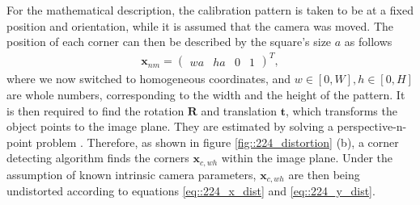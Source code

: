 For the mathematical description, the calibration pattern is taken to be at a fixed position and orientation, while it is assumed that the camera was moved. The position of each corner can then be described by the square's size $a$ as follows
\begin{align}
	\bm{x}_{nm} = \begin{pmatrix}
	wa & ha & 0 & 1
	\end{pmatrix}^T,
	\label{eq::224_square_size}
\end{align}
where we now switched to homogeneous coordinates, and $w\in[0,W],h\in[0,H]$ are whole numbers, corresponding to the width and the height of the pattern. It is then required to find the rotation $\bm{R}$ and translation $\bm{t}$, which transforms the object points to the image plane. They are estimated by solving a perspective-n-point problem \cite{fischler1981random}. Therefore, as shown in figure \ref{fig::224_distortion} (b), a corner detecting algorithm finds the corners $\bm{x}_{c,wh}$ within the image plane. Under the assumption of known intrinsic camera parameters, $\bm{x}_{c,wh}$ are then being undistorted according to equations \ref{eq::224_x_dist} and \ref{eq::224_y_dist}. 
